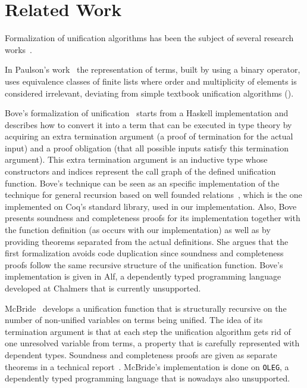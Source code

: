 \section{Related Work}\label{related}

Formalization of unification algorithms has been the subject of
several research works~.

In Paulson's work~ the representation of terms, built
by using a binary operator, uses equivalence classes of finite lists
where order and multiplicity of elements is considered irrelevant,
deviating from simple textbook unification algorithms
().

Bove's formalization of unification~ starts from a
Haskell implementation and describes how to convert it into a term that
can be executed in type theory by acquiring an extra termination
argument (a proof of termination for the actual input) and a proof
obligation (that all possible inputs satisfy this termination argument).
This extra termination argument is an inductive type whose
constructors and indices represent the call graph of the defined
unification function. Bove's technique can be seen as an specific
implementation of the technique for general recursion based on well
founded relations~, which is the one implemented on
Coq's standard library, used in our implementation.  Also, Bove
presents soundness and completeness proofs for its implementation
together with the function definition (as occurs with our
implementation) as well as by providing theorems separated from the
actual definitions. She argues that the first formalization avoids
code duplication since soundness and completeness proofs follow the
same recursive structure of the unification function. Bove's
implementation is given in Alf, a dependently typed programming
language developed at Chalmers that is currently unsupported.

McBride~ develops a unification function that is
structurally recursive on the number of non-unified variables on terms
being unified. The idea of its termination argument is that at each
step the unification algorithm gets rid of one unresolved variable
from terms, a property that is carefully represented with dependent
types. Soundness and completeness proofs are given as separate
theorems in a technical report~. McBride's
implementation is done on \texttt{OLEG}, a dependently typed
programming language that is nowadays also unsupported.


